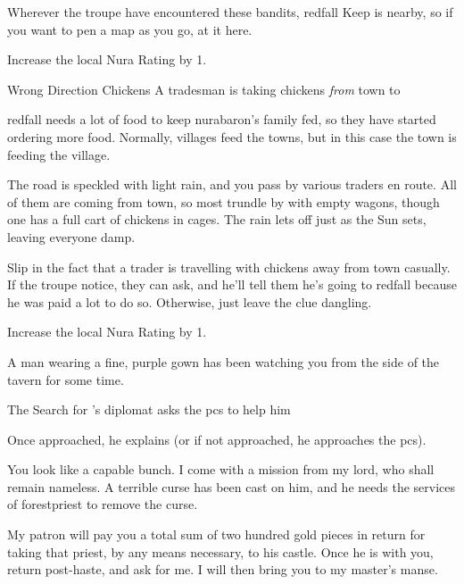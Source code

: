 Wherever the troupe have encountered these bandits, \gls{redfall} Keep is nearby, so if you want to pen a map as you go, at it here.

Increase the local Nura Rating by 1.

{Wrong Direction Chickens}%
{A tradesman is taking chickens \emph{from} town to }%

\Gls{redfall} needs a lot of food to keep \gls{nurabaron}'s family fed, so they have started ordering more food.
Normally, \glspl{village} feed the towns, but in this case the town is feeding the village.

\begin{boxtext}

  The road is speckled with light rain, and you pass by various traders en route.
  All of them are coming from town, so most trundle by with empty wagons, though one has a full cart of chickens in cages.
  The rain lets off just as the Sun sets, leaving everyone damp.

\end{boxtext}

Slip in the fact that a trader is travelling with chickens away from \gls{town} casually.
If the troupe notice, they can ask, and he'll tell them he's going to \gls{redfall} because he was paid a lot to do so.
Otherwise, just leave the clue dangling.

Increase the local Nura Rating by 1.

\begin{boxtext}

  A man wearing a fine, purple gown has been watching you from the side of the tavern for some time.

\end{boxtext}

{The Search for }%
{'s diplomat asks the \glspl{pc} to help him}%
\label{nonstarter}

Once approached, he explains (or if not approached, he approaches the \glspl{pc}).

\begin{speechtext}

  You look like a capable bunch.
  I come with a mission from my lord, who shall remain nameless.
  A terrible curse has been cast on him, and he needs the services of \gls{forestpriest} to remove the curse.

  My patron will pay you a total sum of two hundred gold pieces in return for taking that priest, by any means necessary, to his castle.
  Once he is with you, return post-haste, and ask for me.
  I will then bring you to my master's manse.

\end{speechtext}

